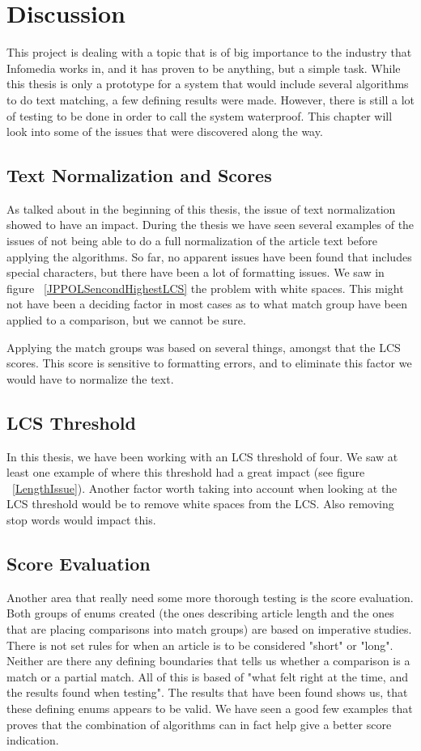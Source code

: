 \chapter{Discussion}

This project is dealing with a topic that is of big importance to the industry that Infomedia works in, and it has proven to be anything, but a simple task. While this thesis is only a prototype for a system that would include several algorithms to do text matching, a few defining results were made. However, there is still a lot of testing to be done in order to call the system waterproof. This chapter will look into some of the issues that were discovered along the way.

\section{Text Normalization and Scores}
As talked about in the beginning of this thesis, the issue of text normalization showed to have an impact. During the thesis we have seen several examples of the issues of not being able to do a full normalization of the article text before applying the algorithms. So far, no apparent issues have been found that includes special characters, but there have been a lot of formatting issues. We saw in figure ~\ref{JPPOLSencondHighestLCS} the problem with white spaces. This might not have been a deciding factor in most cases as to what match group have been applied to a comparison, but we cannot be sure.

Applying the match groups was based on several things, amongst that the LCS scores. This score is sensitive to formatting errors, and to eliminate this factor we would have to normalize the text.

\section{LCS Threshold}
In this thesis, we have been working with an LCS threshold of four. We saw at least one example of where this threshold had a great impact (see figure ~\ref{LengthIssue}). Another factor worth taking into account when looking at the LCS threshold would be to remove white spaces from the LCS. Also removing stop words would impact this.

\section{Score Evaluation}
Another area that really need some more thorough testing is the score evaluation. Both groups of enums created (the ones describing article length and the ones that are placing comparisons into match groups) are based on imperative studies. There is not set rules for when an article is to be considered "short" or "long". Neither are there any defining boundaries that tells us whether a comparison is a match or a partial match. All of this is based of "what felt right at the time, and the results found when testing". The results that have been found shows us, that these defining enums appears to be valid. We have seen a good few examples that proves that the combination of algorithms can in fact help give a better score indication. 

